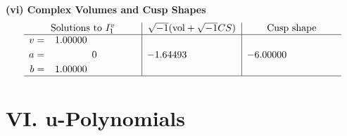 \documentclass[1p]{elsarticle_modified}
\theoremstyle{definition}
\newcommand{\I}{\sqrt{-1}}
\begin{document}
\newpage\flushleft \textbf{(vi) Complex Volumes and Cusp Shapes}
$$\begin{array}{c|c|c}  
\text{Solutions to }I^v_{1}& \I (\text{vol} + \sqrt{-1}CS) & \text{Cusp shape}\\
 \hline 
\begin{aligned}
v &= \phantom{-}1.00000\phantom{ +0.000000I} \\
a &= \phantom{-0.000000 } 0 \\
b &= \phantom{-}1.00000\phantom{ +0.000000I}\end{aligned}
 & -1.64493\phantom{ +0.000000I} & -6.00000\phantom{ +0.000000I}\\
 \hline 
 \end{array}$$\newpage
\newpage\renewcommand{\arraystretch}{1}
\centering \section*{ VI. u-Polynomials}
\end{document}
